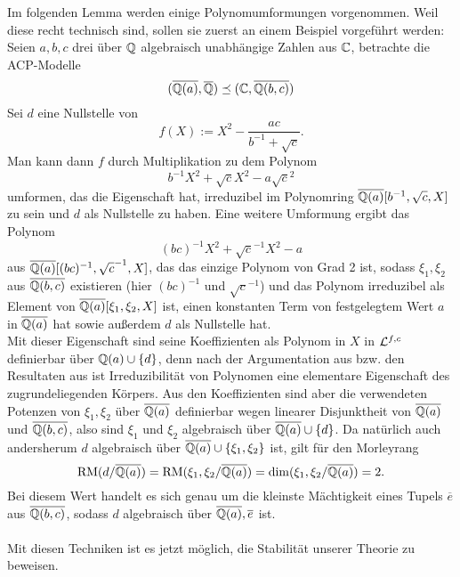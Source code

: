     Im folgenden Lemma werden einige Polynomumformungen vorgenommen. Weil diese recht technisch sind, sollen sie zuerst an einem Beispiel vorgeführt werden: Seien $a,b,c$ drei über $\mathbb{Q}$ algebraisch unabhängige Zahlen aus $\mathbb{C}$, betrachte die ACP-Modelle $$(\overline{\mathbb{Q}(a)},\overline{\mathbb{Q}})\preceq(\mathbb{C},\overline{\mathbb{Q}(b,c)})$$ Sei $d$ eine Nullstelle von $$f(X):=X^2-\frac{ac}{b^{-1}+\sqrt{c}}.$$ Man kann dann $f$ durch Multiplikation zu dem Polynom $$b^{-1}X^2+\sqrt{c}X^2-a\sqrt{c}^2$$ umformen, das die Eigenschaft hat, irreduzibel im Polynomring $\overline{\mathbb{Q}(a)}[b^{-1},\sqrt{c},X]$ zu sein und $d$ als Nullstelle zu haben. Eine weitere Umformung ergibt das Polynom $$(bc)^{-1}X^2+\sqrt{c}^{-1}X^2-a$$ aus $\overline{\mathbb{Q}(a)}[(bc)^{-1},\sqrt{c}^{-1},X]$, das das einzige Polynom von Grad 2 ist, sodass $\xi_1,\xi_2$ aus $\overline{\mathbb{Q}(b,c)}$ existieren (hier $(bc)^{-1}$ und $\sqrt{c}^{-1}$) und das Polynom irreduzibel als Element von $\overline{\mathbb{Q}(a)}[\xi_1,\xi_2,X]$ ist, einen konstanten Term von festgelegtem Wert $a$ in $\overline{\mathbb{Q}(a)}$ hat sowie außerdem $d$ als Nullstelle hat.\\
    Mit dieser Eigenschaft sind seine Koeffizienten als Polynom in $X$ in $\mathcal{L}^{f,c}$ definierbar über $\mathbb{Q}(a)\cup\{d\}$, denn nach der Argumentation aus \cite{Chatzidakis} bzw. den Resultaten aus \cite{Schmidt} ist Irreduzibilität von Polynomen eine elementare Eigenschaft des zugrundeliegenden Körpers. Aus den Koeffizienten sind aber die verwendeten Potenzen von $\xi_1,\xi_2$ über $\overline{\mathbb{Q}(a)}$ definierbar wegen linearer Disjunktheit von $\overline{\mathbb{Q}(a)}$ und $\overline{\mathbb{Q}(b,c)}$, also sind $\xi_1$ und $\xi_2$ algebraisch über $\overline{\mathbb{Q}(a)}\cup\{d\}$.\newpage
    Da natürlich auch andersherum $d$ algebraisch über $\overline{\mathbb{Q}(a)}\cup\{\xi_1,\xi_2\}$ ist, gilt für den Morleyrang $$\operatorname{RM}(d/\overline{\mathbb{Q}(a)})=\operatorname{RM}(\xi_1,\xi_2/\overline{\mathbb{Q}(a)})=\dim(\xi_1,\xi_2/\overline{\mathbb{Q}(a)})=2.$$
    Bei diesem Wert handelt es sich genau um die kleinste Mächtigkeit eines Tupels $\overline{e}$ aus $\overline{\mathbb{Q}(b,c)}$, sodass $d$ algebraisch über $\overline{\mathbb{Q}(a)},\overline{e}$ ist.\\\\
    Mit diesen Techniken ist es jetzt möglich, die Stabilität unserer Theorie zu beweisen.
    
